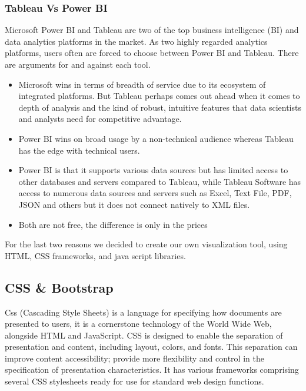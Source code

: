 \subsubsection{Tableau Vs Power BI}
Microsoft Power BI and Tableau are two of the top business intelligence (BI) and data analytics platforms in the market. As two highly regarded analytics platforms, users often are forced to choose between Power BI and Tableau. There are arguments for and against each tool\cite{robbPowerBIVs2022}.
\begin{itemize}
    \renewcommand{\labelitemi}{$\bullet$}
    \item Microsoft wins in terms of breadth of service due to its ecosystem of integrated platforms. But Tableau perhaps comes out ahead when it comes to depth of analysis and the kind of robust, intuitive features that data scientists and analysts need for competitive advantage.
    \item Power BI wins on broad usage by a non-technical audience whereas Tableau has the edge with technical users.
    \item Power BI is that it supports various data sources but has limited access to other databases and servers compared to Tableau, while Tableau Software has access to numerous data sources and servers such as Excel, Text File, PDF, JSON and others but it does not connect natively to XML files.
    \item Both are not free, the difference is only in the prices
\end{itemize}
\bigbreak
For the last two reasons we decided to create our own visualization tool, using HTML, CSS frameworks, and java script libraries.
\newpage
\subsection{CSS \& Bootstrap}
Css (Cascading Style Sheets) is a language for specifying how documents are presented to users\cite{WhatCSSLearn}, it is a cornerstone technology of the World Wide Web, alongside HTML and JavaScript. CSS is designed to enable the separation of presentation and content, including layout, colors, and fonts. This separation can improve content accessibility; provide more flexibility and control in the specification of presentation characteristics\cite{CSS2022}. It has various frameworks comprising several CSS stylesheets ready for use  for standard web design functions.

